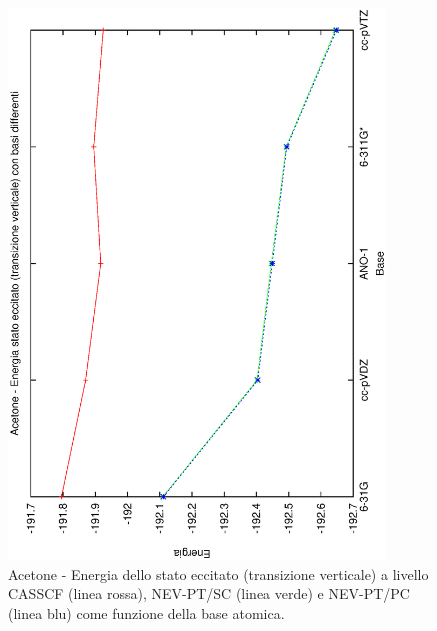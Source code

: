 \begin{figure}[ht]
\begin{center}
\includegraphics[angle=270,width=10cm,keepaspectratio]{immagini/acetone/vert.eps}
\parbox[h]{12cm}{
\caption{\small Acetone - Energia dello stato eccitato (transizione verticale)
a livello CASSCF (linea rossa), NEV-PT/SC (linea verde) e NEV-PT/PC (linea blu)
come funzione della base atomica. }
\label{fig:acetone_vert}
}
\end{center}
\end{figure}
